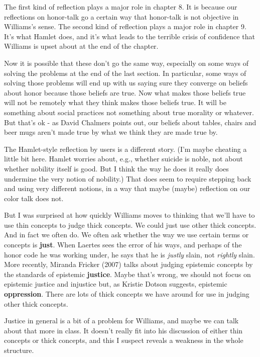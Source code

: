 \documentclass[
]{article}
\begin{document}
The first kind of reflection plays a major role in chapter 8. It is
because our reflections on honor-talk go a certain way that honor-talk
is not objective in Williams's sense. The second kind of reflection
plays a major role in chapter 9. It's what Hamlet does, and it's what
leads to the terrible crisis of confidence that Williams is upset about
at the end of the chapter.

Now it is possible that these don't go the same way, especially on some
ways of solving the problems at the end of the last section. In
particular, some ways of solving those problems will end up with us
saying sure they converge on beliefs about honor because those beliefs
are true. Now what makes those beliefs true will not be remotely what
they think makes those beliefs true. It will be something about social
practices not something about true morality or whatever. But that's ok -
as David Chalmers points out, our beliefs about tables, chairs and beer
mugs aren't made true by what we think they are made true by.

The Hamlet-style reflection by users is a different story. (I'm maybe
cheating a little bit here. Hamlet worries about, e.g., whether suicide
is noble, not about whether nobility itself is good. But I think the way
he does it really does undermine the very notion of nobility.) That does
seem to require stepping back and using very different notions, in a way
that maybe (maybe) reflection on our color talk does not.

But I was surprised at how quickly Williams moves to thinking that we'll
have to use thin concepts to judge thick concepts. We could just use
other thick concepts. And in fact we often do. We often ask whether the
way we use certain terms or concepts is \textbf{just}. When Laertes sees
the error of his ways, and perhaps of the honor code he was working
under, he says that he is \emph{justly} slain, not \emph{rightly} slain.
More recently, Miranda Fricker (2007) talks about judging epistemic
concepts by the standards of epistemic \textbf{justice}. Maybe that's
wrong, we should not focus on epistemic justice and injustice but, as
Kristie Dotson suggests, epistemic \textbf{oppression}. There are lots
of thick concepts we have around for use in judging other thick
concepts.

Justice in general is a bit of a problem for Williams, and maybe we can
talk about that more in class. It doesn't really fit into his discussion
of either thin concepts or thick concepts, and this I suspect reveals a
weakness in the whole structure.
\end{document}

